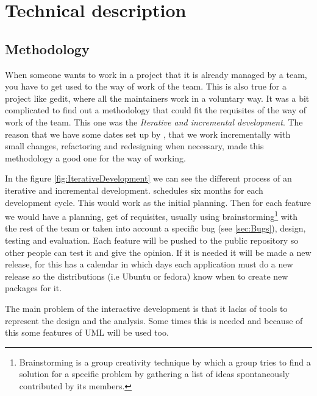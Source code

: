 
\chapter{Technical description}


\section{Methodology}\label{sec:Methodology}

When someone wants to work in a project that it is already managed by a team, you have to get used to the way of work of the team. This is also true for a project like gedit, where all the maintainers work in a voluntary way. It was a bit complicated to find out a methodology that could fit the requisites of the way of work of the team. This one was the \emph{Iterative and incremental development}. The reason that we have some dates set up by \GNOME, that we work incrementally with small changes, refactoring and redesigning when necessary, made this methodology a good one for the way of working.



In the figure \ref{fig:IterativeDevelopment} we can see the different process of an iterative and incremental development. \GNOME schedules six months for each development cycle. This would work as the initial planning. Then for each feature we would have a planning, get of requisites, usually using brainstorming\footnote{Brainstorming is a group creativity technique by which a group tries to find a solution for a specific problem by gathering a list of ideas spontaneously contributed by its members.} with the rest of the team or taken into account a specific bug (see \ref{sec:Bugs}), design, testing and evaluation. Each feature will be pushed to the public repository so other people can test it and give the opinion. If it is needed it will be made a new release, for this \GNOME has a calendar in which days each application must do a new release so the distributions (i.e Ubuntu or fedora) know when to create new packages for it.

The main problem of the interactive development is that it lacks of tools to represent the design and the analysis. Some times this is needed and because of this some features of UML will be used too.

